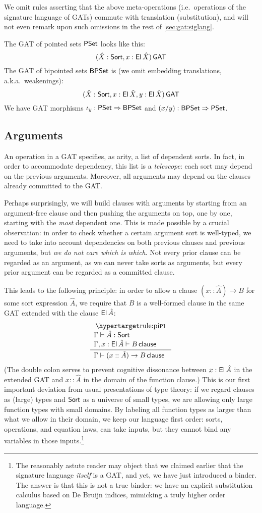 \documentclass[a4paper]{article}
\begin{document}
We omit rules asserting that the above meta-operations (i.e.\ operations of the signature language of GATs) commute with translation (substitution), and will not even remark upon such omissions in the rest of \cref{sec:gat:siglang}.
\begin{example}
	The GAT of pointed sets $\mathsf{PSet}$ looks like this:
	\[
		(\hat X : {\mathsf{Sort}}, x : {\mathsf{El}}\,\hat X) \,\mathsf{GAT}
	\]
	The GAT of bipointed sets $\mathsf{BPSet}$ is (we omit embedding translations, a.k.a.\ weakenings):
	\[
		(\hat X : {\mathsf{Sort}}, x : {\mathsf{El}}\,\hat X, y : {\mathsf{El}}\,\hat X) \,\mathsf{GAT}
	\]
	We have GAT morphisms $\iota_y : \mathsf{PSet} \Rightarrow \mathsf{BPSet}$ and $(x/y) : \mathsf{BPSet} \Rightarrow \mathsf{PSet}$.
\end{example}

\subsection{Arguments}
An operation in a GAT specifies, as arity, a list of dependent sorts.
In fact, in order to accommodate dependency, this list is a \emph{telescope}: each sort may depend on the previous arguments.
Moreover, all arguments may depend on the clauses already committed to the GAT.

Perhaps surprisingly, we will build clauses with arguments by starting from an argument-free clause and then pushing the arguments on top, one by one, starting with the \emph{most} dependent one.
This is made possible by a crucial observation: in order to check whether a certain argument sort is well-typed, we need to take into account dependencies on both previous clauses and previous arguments, but \emph{we do not care which is which}.
Not every prior clause can be regarded as an argument, as we can never take sorts as arguments, but every prior argument can be regarded as a committed clause.

This leads to the following principle: in order to allow a clause $(x :: \hat A) \to B$ for some sort expression $\hat A$, we require that $B$ is a well-formed clause in the same GAT extended with the clause ${\mathsf{El}}\,\hat A$:
\[
	\inferencel{pi}{
		\Gamma \sez \hat A : \Sort \\
		\Gamma, x : \El\,\hat A \sez B \clause	
	}{
		\Gamma \sez (x :: \hat A) \to B \clause
	}{}
\]
(The double colon serves to prevent cognitive dissonance between $x : {\mathsf{El}}\,\hat A$ in the extended GAT and $x :: \hat A$ in the domain of the function clause.)
This is our first important deviation from usual presentations of type theory: if we regard clauses as (large) types and ${\mathsf{Sort}}$ as a universe of small types, we are allowing only large function types with small domains.
By labeling all function types as larger than what we allow in their domain, we keep our language first order: sorts, operations, and equation laws, can take inputs, but they cannot bind any variables in those inputs.\footnote{The reasonably astute reader may object that we claimed earlier that the signature language \emph{itself} is a GAT, and yet, we have just introduced a binder. The answer is that this is not a true binder: we have an explicit substitution calculus based on De Bruijn indices, mimicking a truly higher order language.}
\end{document}
